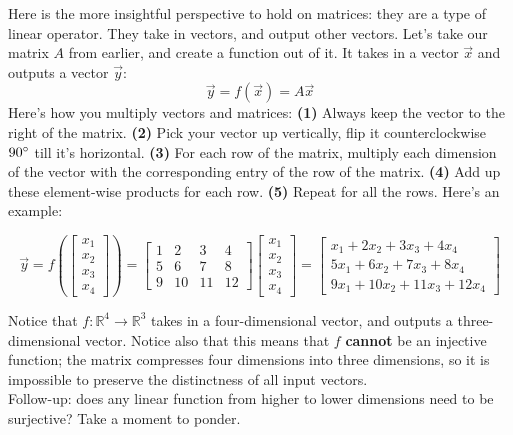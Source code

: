 \documentclass{article}
\begin{document}
Here is the more insightful perspective to hold on matrices: they are a type of linear operator. They take in vectors, and output other vectors. Let's take our matrix $A$ from earlier, and create a function out of it. It takes in a vector $\vec{x}$ and outputs a vector $\vec{y}$:
\[\vec{y} = f(\vec{x}) = A\vec{x}\]
Here's how you multiply vectors and matrices: \textbf{(1)} Always keep the vector to the right of the matrix. \textbf{(2)} Pick your vector up vertically, flip it counterclockwise $90\degree$ till it's horizontal. \textbf{(3)} For each row of the matrix, multiply each dimension of the vector with the corresponding entry of the row of the matrix. \textbf{(4)} Add up these element-wise products for each row. \textbf{(5)} Repeat for all the rows. Here's an example:

\begin{equation*}\vec{y} = f\left(\begin{bmatrix} x_1 \\ x_2 \\ x_3 \\ x_4\end{bmatrix}\right) = \begin{bmatrix}
    1 & 2 & 3 & 4 \\
    5 & 6 & 7 & 8 \\
    9 & 10 & 11 & 12 \end{bmatrix}\begin{bmatrix} x_1 \\ x_2 \\ x_3 \\ x_4\end{bmatrix} = \begin{bmatrix}
    x_1 + 2x_2 + 3x_3 + 4x_4 \\
    5x_1 + 6x_2 + 7x_3 + 8x_4 \\
    9x_1 + 10x_2 + 11x_3 + 12x_4 \end{bmatrix}\end{equation*}

Notice that $f: \mathbb{R}^4 \to \mathbb{R}^3$ takes in a four-dimensional vector, and outputs a three-dimensional vector. Notice also that this means that $f$ \textbf{cannot} be an injective function; the matrix compresses four dimensions into three dimensions, so it is impossible to preserve the distinctness of all input vectors. \\

Follow-up: does any linear function from higher to lower dimensions need to be surjective? Take a moment to ponder. \\
\end{document}
